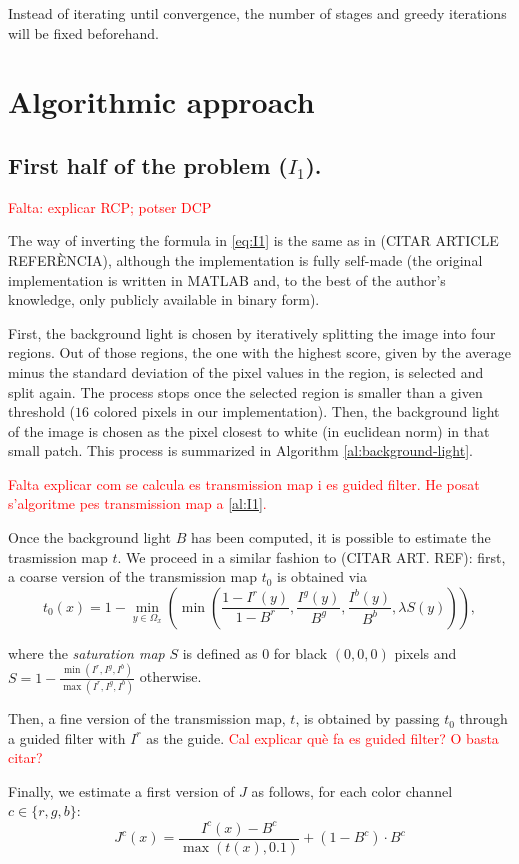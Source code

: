 \documentclass[twocolumn,twoside,a4paper,10pt]{IEEEtran}
\newcommand{\Frank}[1]{\textcolor{red}{#1}}
\begin{document}
Instead of iterating until convergence, the number of stages and greedy iterations will be fixed beforehand.

\section{Algorithmic approach}
\subsection{First half of the problem (\(I_1\)).}
\Frank{Falta: explicar RCP; potser DCP}

The way of inverting the formula in \cref{eq:I1} is the same as in (CITAR ARTICLE REFERÈNCIA), although the implementation is fully self-made (the original implementation is written in MATLAB and, to the best of the author's knowledge, only publicly available in binary form).

First, the background light is chosen by iteratively splitting the image into four regions. Out of those regions, the one with the highest score, given by the average minus the standard deviation of the pixel values in the region, is selected and split again. The process stops once the selected region is smaller than a given threshold (\(16\) colored pixels in our implementation). Then, the background light of the image is chosen as the pixel closest to white (in euclidean norm) in that small patch. This process is summarized in Algorithm \ref{al:background-light}.

\Frank{Falta explicar com se calcula es transmission map i es guided filter. He posat s'algoritme pes transmission map a \ref{al:I1}.}

Once the background light \(B\) has been computed, it is possible to estimate the trasmission map \(t\). We proceed in a similar fashion to (CITAR ART. REF): first, a coarse version of the transmission map \(t_0\) is obtained via
\[
  t_0(x) = 1 - \min_{y\in\Omega_x}\left(\min\left(\frac{1-I^r(y)}{1-B^r}, \frac{I^g(y)}{B^g}, \frac{I^b(y)}{B^b}, \lambda S(y)\right)\right)
,\]

where the \textit{saturation map} \(S\) is defined as \(0\) for black \((0, 0, 0)\) pixels and \(S=1-\frac{\min(I^r, I^g, I^b)}{\max(I^r, I^g, I^b)}\) otherwise.

Then, a fine version of the transmission map, \(t\), is obtained by passing \(t_0\) through a guided filter with \(I^r\) as the guide. \Frank{Cal explicar què fa es guided filter? O basta citar?}

Finally, we estimate a first version of \(J\) as follows, for each color channel \(c\in\{r, g, b\}\):
\begin{equation}\label{eq:J0}
  J^c(x) = \frac{I^c(x) - B^c}{\max(t(x), 0.1)} + (1-B^c)\cdot B^c
\end{equation}
\end{document}
